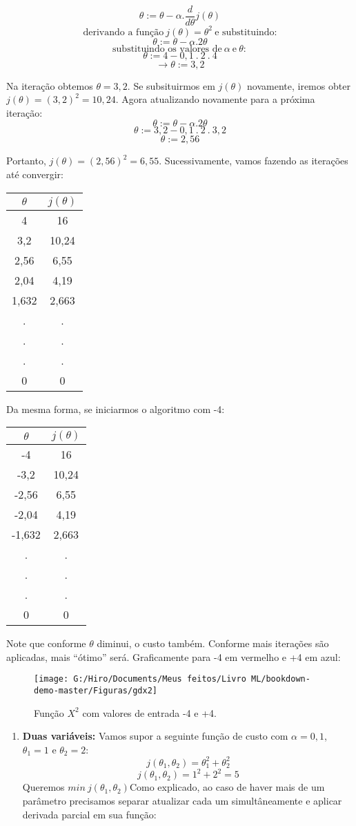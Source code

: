 \documentclass[
]{book}
\providecommand{\tightlist}{%
  \setlength{\itemsep}{0pt}\setlength{\parskip}{0pt}}
\begin{document}
\[\theta := \theta-\alpha.\frac{d}{d\theta}j(\theta) \]
\[\mbox{derivando a função} \ j(\theta)=\theta^2 \ \mbox{e substituindo:}\]
\[\theta:= \theta -\alpha.2\theta \]
\[\mbox{substituindo os valores de}\ \alpha\ \mbox{e}\ \theta: \]
\[\theta:=4-0,1 \ .\ 2\ .\ 4 \]
\[\rightarrow \theta:=3,2\]

Na iteração obtemos \(\theta=3,2\). Se subsituirmos em \(j(\theta)\) novamente, iremos obter \(j(\theta)=(3,2)^2=10,24\). Agora atualizando novamente para a próxima iteração:
\[\theta:= \theta -\alpha.2\theta \]
\[\theta:=3,2-0,1\ .\ 2\ .\ 3,2\]
\[\theta:= 2,56\]

Portanto, \(j(\theta)=(2,56)^2=6,55\). Sucessivamente, vamos fazendo as iterações até convergir:

\begin{longtable}[]{@{}cc@{}}
\toprule
\textbf{\(\theta\)} & \textbf{\(j(\theta)\)}\tabularnewline
\midrule
\endhead
4 & 16\tabularnewline
3,2 & 10,24\tabularnewline
2,56 & 6,55\tabularnewline
2,04 & 4,19\tabularnewline
1,632 & 2,663\tabularnewline
. & .\tabularnewline
. & .\tabularnewline
. & .\tabularnewline
0 & 0\tabularnewline
\bottomrule
\end{longtable}

Da mesma forma, se iniciarmos o algoritmo com -4:

\begin{longtable}[]{@{}cc@{}}
\toprule
\textbf{\(\theta\)} & \textbf{\(j(\theta)\)}\tabularnewline
\midrule
\endhead
-4 & 16\tabularnewline
-3,2 & 10,24\tabularnewline
-2,56 & 6,55\tabularnewline
-2,04 & 4,19\tabularnewline
-1,632 & 2,663\tabularnewline
. & .\tabularnewline
. & .\tabularnewline
. & .\tabularnewline
0 & 0\tabularnewline
\bottomrule
\end{longtable}

Note que conforme \(\theta\) diminui, o custo também. Conforme mais iterações são aplicadas, mais ``ótimo'' será. Graficamente para -4 em vermelho e +4 em azul:

\begin{figure}

{\centering \texttt{[image: G:/Hiro/Documents/Meus feitos/Livro ML/bookdown-demo-master/Figuras/gdx2]} 

}

\caption{Função \(X^2\) com valores de entrada -4 e +4.}\label{fig:gdx2}
\end{figure}



\begin{enumerate}
\def\labelenumi{\arabic{enumi}.}
\setcounter{enumi}{1}
\tightlist
\item
  \textbf{Duas variáveis:} Vamos supor a seguinte função de custo com \(\alpha=0,1\), \(\theta_1=1\) e \(\theta_2=2\):
  \[j(\theta_1,\theta_2)=\theta_1^2+\theta_2^2\]
  \[j(\theta_1,\theta_2)=1^2+2^2=5\]
  Queremos \(min \ j(\theta_1,\theta_2)\)Como explicado, ao caso de haver mais de um parâmetro precisamos separar atualizar cada um simultâneamente e aplicar derivada parcial em sua função:
\end{enumerate}
\end{document}
